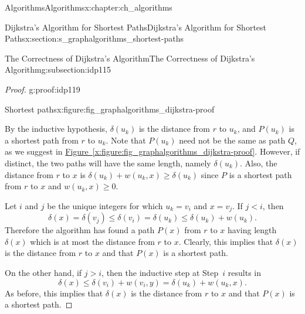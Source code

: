 \documentclass[oneside,10pt,]{book}
\newcommand{\xreffont}{\relax}
\numberwithin{equation}{section}
\newcommand{\lt}{<}
\begin{document}
\begin{chapterptx}{Algorithms}{}{Algorithms}{}{}{x:chapter:ch_algorithms}
\begin{sectionptx}{Dijkstra's Algorithm for Shortest Paths}{}{Dijkstra's Algorithm for Shortest Paths}{}{}{x:section:s_graphalgorithms_shortest-paths}
\begin{subsectionptx}{The Correctness of Dijkstra's Algorithm}{}{The Correctness of Dijkstra's Algorithm}{}{}{g:subsection:idp115}
\begin{proof}{}{g:proof:idp119}
\begin{figureptx}{Shortest paths}{x:figure:fig_graphalgorithms_dijkstra-proof}{}%
\begin{image}{0.125}{0.75}{0.125}%
%
\end{image}%
\tcblower
\end{figureptx}%
By the inductive hypothesis, \(\delta(u_k)\) is the distance from \(r\) to \(u_k\), and \(P(u_k)\) is a shortest path from \(r\) to \(u_k\). Note that \(P(u_k)\) need not be the same as path \(Q\), as we suggest in \hyperref[x:figure:fig_graphalgorithms_dijkstra-proof]{Figure~{\xreffont\ref{x:figure:fig_graphalgorithms_dijkstra-proof}}}. However, if distinct, the two paths will have the same length, namely \(\delta(u_k)\).  Also, the distance from \(r\) to \(x\) is \(\delta(u_k)+w(u_k,x)\ge \delta(u_k)\) since \(P\) is a shortest path from \(r\) to \(x\) and \(w(u_k,x)\geq 0\).%
\par
Let \(i\) and \(j\) be the unique integers for which \(u_k=v_i\) and \(x=v_j\). If \(j \lt i\), then%
\begin{equation*}
\delta(x)= \delta(v_j)\le \delta(v_i)= \delta(u_k)\le
\delta(u_k)+w(u_k).
\end{equation*}
Therefore the algorithm has found a path \(P(x)\) from \(r\) to \(x\) having length \(\delta(x)\) which is at most the distance from \(r\) to \(x\). Clearly, this implies that \(\delta(x)\) is the distance from \(r\) to \(x\) and that \(P(x)\) is a shortest path.%
\par
On the other hand, if \(j>i\), then the inductive step at Step~\(i\) results in%
\begin{equation*}
\delta(x)\le \delta(v_i)+w(v_i,y)=\delta(u_k)+w(u_k,x).
\end{equation*}
As before, this implies that \(\delta(x)\) is the distance from \(r\) to \(x\) and that \(P(x)\) is a shortest path.%
\end{proof}
\end{subsectionptx}
\end{sectionptx}
%
%
\typeout{************************************************}

\end{chapterptx}
\end{document}
